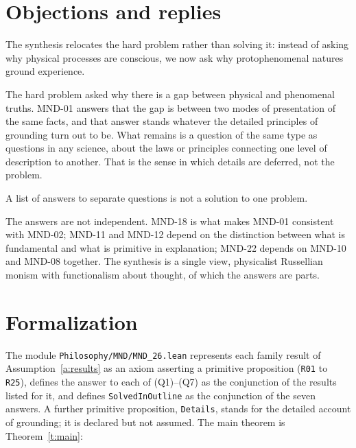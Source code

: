 \documentclass{situationist-preprint}
\begin{document}
\section{Objections and replies}

\begin{objection}[Relocation]
The synthesis relocates the hard problem rather than solving it: instead of asking why physical processes are conscious, we now ask why protophenomenal natures ground experience.
\end{objection}

\begin{reply}
The hard problem asked why there is a gap between physical and phenomenal truths. MND-01 answers that the gap is between two modes of presentation of the same facts, and that answer stands whatever the detailed principles of grounding turn out to be. What remains is a question of the same type as questions in any science, about the laws or principles connecting one level of description to another. That is the sense in which details are deferred, not the problem.
\end{reply}

\begin{objection}[Aggregation]
A list of answers to separate questions is not a solution to one problem.
\end{objection}

\begin{reply}
The answers are not independent. MND-18 is what makes MND-01 consistent with MND-02; MND-11 and MND-12 depend on the distinction between what is fundamental and what is primitive in explanation; MND-22 depends on MND-10 and MND-08 together. The synthesis is a single view, physicalist Russellian monism with functionalism about thought, of which the answers are parts.
\end{reply}

\section{Formalization}

The module \nolinkurl{Philosophy/MND/MND_26.lean} represents each family result of Assumption~\ref{a:results} as an axiom asserting a primitive proposition (\texttt{R01} to \texttt{R25}), defines the answer to each of (Q1)--(Q7) as the conjunction of the results listed for it, and defines \texttt{SolvedInOutline} as the conjunction of the seven answers. A further primitive proposition, \texttt{Details}, stands for the detailed account of grounding; it is declared but not assumed. The main theorem is Theorem~\ref{t:main}:
\end{document}
